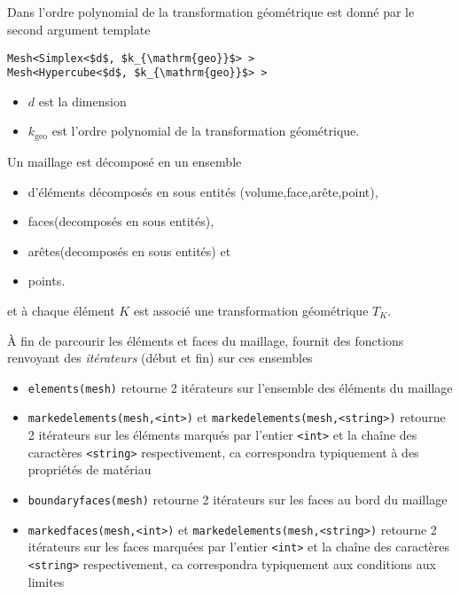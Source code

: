 \subsection{\Feel}
\label{sec:feel}

Dans \Feel l'ordre polynomial de la transformation géométrique est donné par
le second argument template
\begin{lstlisting}
Mesh<Simplex<$d$, $k_{\mathrm{geo}}$> >
Mesh<Hypercube<$d$, $k_{\mathrm{geo}}$> >
\end{lstlisting}
\begin{itemize}
\item $d$ est la dimension
\item $k_{\mathrm{geo}}$ est l'ordre polynomial de la transformation géométrique.
\end{itemize}



Un maillage est décomposé en un ensemble
\begin{itemize}
\item d'éléments  décomposés  en sous entités  (volume,face,arête,point),
\item faces(decomposés en sous entités),
\item arêtes(decomposés en sous entités) et
\item points.
\end{itemize}
et à chaque élément $K$ est associé une transformation géométrique $T_K$.

À fin de parcourir les éléments et faces du maillage, \Feel fournit des
fonctions renvoyant des \emph{itérateurs} (début et fin) sur ces ensembles
\begin{itemize}
\item \lstinline!elements(mesh)! retourne 2 itérateurs sur l'ensemble des
  éléments du maillage
\item \lstinline!markedelements(mesh,<int>)!  et
  \lstinline!markedelements(mesh,<string>)! retourne 2 itérateurs sur les
  éléments marqués par  l'entier \lstinline!<int>! et la chaîne des caractères
  \lstinline!<string>! respectivement, ca correspondra typiquement à des
  propriétés de matériau
\item \lstinline!boundaryfaces(mesh)! retourne 2 itérateurs sur les faces au
  bord du maillage
\item \lstinline!markedfaces(mesh,<int>)! et
  \lstinline!markedelements(mesh,<string>)! retourne 2 itérateurs sur les
  faces marquées par  l'entier \lstinline!<int>! et la chaîne des caractères
  \lstinline!<string>! respectivement, ca correspondra typiquement aux
  conditions aux limites
\end{itemize}


